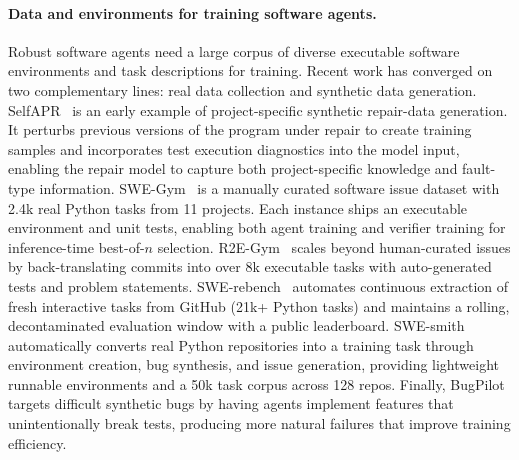 \paragraph{Data and environments for training software agents.}
Robust software agents need a large corpus of diverse executable software environments and task descriptions for training. Recent work has converged on two complementary lines: real data collection and synthetic data generation.
SelfAPR~\cite{selfapr} is an early example of project-specific synthetic repair-data generation. It perturbs previous versions of the program under repair to create training samples and incorporates test execution diagnostics into the model input, enabling the repair model to capture both project-specific knowledge and fault-type information.
SWE-Gym~\cite{swegym} is a manually curated software issue dataset with 2.4k real Python tasks from 11 projects. Each instance ships an executable environment and unit tests, enabling both agent training and verifier training for inference-time best-of-$n$ selection.
R2E-Gym~\cite{jain2025r2e} scales beyond human-curated issues by back-translating commits into over 8k executable tasks with auto-generated tests and problem statements.
SWE-rebench~\cite{badertdinov2025swerebenchautomatedpipelinetask} automates continuous extraction of fresh interactive tasks from GitHub (21k+ Python tasks) and maintains a rolling, decontaminated evaluation window with a public leaderboard.
SWE-smith~\cite{yang2025swe} automatically converts real Python repositories into a training task through environment creation, bug synthesis, and issue generation, providing lightweight runnable environments and a 50k task corpus across 128 repos.
Finally, BugPilot~\cite{sonwane2025bugpilotcomplexbuggeneration} targets difficult synthetic bugs by having agents implement features that unintentionally break tests, producing more natural failures that improve training efficiency.



